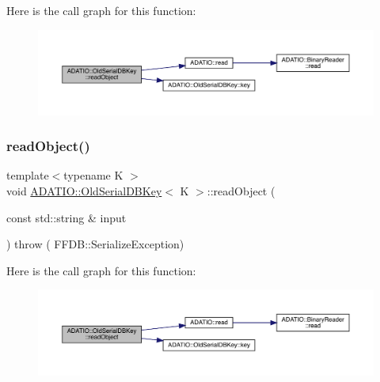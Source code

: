 Here is the call graph for this function\+:
\nopagebreak
\begin{figure}[H]
\begin{center}
\leavevmode
\includegraphics[width=350pt]{dc/d7d/classADATIO_1_1OldSerialDBKey_a4d79b5e8834dc154ddc981e153924ccd_cgraph}
\end{center}
\end{figure}
\mbox{\label{classADATIO_1_1OldSerialDBKey_a4d79b5e8834dc154ddc981e153924ccd}} 
\subsubsection{\texorpdfstring{readObject()}{readObject()}\hspace{0.1cm}{\footnotesize\ttfamily [3/3]}}
{\footnotesize\ttfamily template$<$typename K $>$ \\
void \mbox{\hyperlink{classADATIO_1_1OldSerialDBKey}{A\+D\+A\+T\+I\+O\+::\+Old\+Serial\+D\+B\+Key}}$<$ K $>$\+::read\+Object (\begin{DoxyParamCaption}\item[{const std\+::string \&}]{input }\end{DoxyParamCaption}) throw ( F\+F\+D\+B\+::\+Serialize\+Exception) \hspace{0.3cm}{\ttfamily [inline]}}

Here is the call graph for this function\+:
\nopagebreak
\begin{figure}[H]
\begin{center}
\leavevmode
\includegraphics[width=350pt]{dc/d7d/classADATIO_1_1OldSerialDBKey_a4d79b5e8834dc154ddc981e153924ccd_cgraph}
\end{center}
\end{figure}
\mbox{\label{classADATIO_1_1OldSerialDBKey_af45528e61ba59f1978d3492534dffd46}} 
